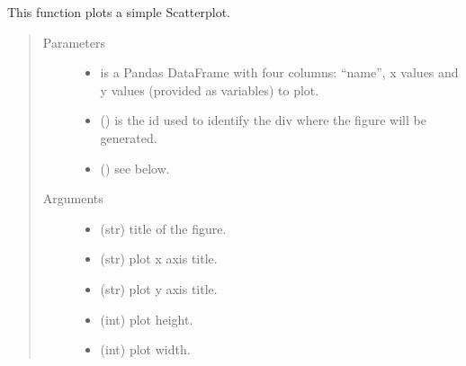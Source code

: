 \documentclass[letterpaper,10pt,english]{sphinxmanual}
\begin{document}

\begin{fulllineitems}
\label{\detokenize{_autosummary/analytics_core.viz:analytics_core.viz.viz.get_scatterplot}}
This function plots a simple Scatterplot.
\begin{quote}\begin{description}
\item[{Parameters}] \leavevmode\begin{itemize}
\item {} 
 \textendash{} is a Pandas DataFrame with four columns: “name”, x values and y values (provided as variables) to plot.

\item {} 
 () \textendash{} is the id used to identify the div where the figure will be generated.

\item {} 
 () \textendash{} see below.

\end{itemize}

\item[{Arguments}] \leavevmode\begin{itemize}
\item {} 
 (str) \textendash{} title of the figure.

\item {} 
 (str) \textendash{} plot x axis title.

\item {} 
 (str) \textendash{} plot y axis title.

\item {} 
 (int) \textendash{} plot height.

\item {} 
 (int) \textendash{} plot width.


\end{itemize}
\end{description}
\end{quote}
\end{fulllineitems}
\end{document}
